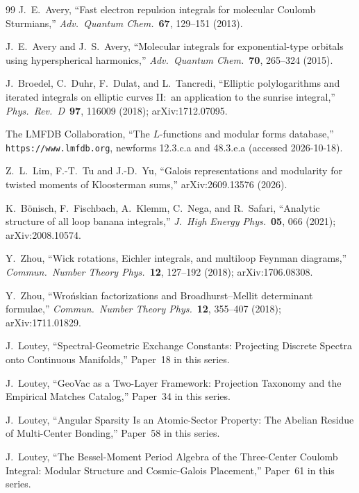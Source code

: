 \documentclass[aps,pra,twocolumn,superscriptaddress,longbibliography]{revtex4-2}
\begin{document}
\begin{thebibliography}{99}
J.~E.~Avery, ``Fast electron repulsion integrals for molecular Coulomb
Sturmians,'' \textit{Adv.\ Quantum Chem.}\ \textbf{67}, 129--151 (2013).

J.~E.~Avery and J.~S.~Avery, ``Molecular integrals for exponential-type orbitals
using hyperspherical harmonics,'' \textit{Adv.\ Quantum Chem.}\ \textbf{70},
265--324 (2015).

J.~Broedel, C.~Duhr, F.~Dulat, and L.~Tancredi, ``Elliptic polylogarithms and
iterated integrals on elliptic curves II:\ an application to the sunrise
integral,'' \textit{Phys.\ Rev.\ D}\ \textbf{97}, 116009 (2018);
arXiv:1712.07095.

The LMFDB Collaboration, ``The $L$-functions and modular forms database,''
\texttt{https://www.lmfdb.org}, newforms 12.3.c.a and 48.3.e.a (accessed 2026-10-18).

Z.~L.~Lim, F.-T.~Tu and J.-D.~Yu, ``Galois representations and modularity
for twisted moments of Kloosterman sums,'' arXiv:2609.13576 (2026).

K.~B\"onisch, F.~Fischbach, A.~Klemm, C.~Nega, and R.~Safari, ``Analytic
structure of all loop banana integrals,'' \textit{J.\ High Energy Phys.}\
\textbf{05}, 066 (2021); arXiv:2008.10574.

Y.~Zhou, ``Wick rotations, Eichler integrals, and multiloop Feynman diagrams,''
\textit{Commun.\ Number Theory Phys.}\ \textbf{12}, 127--192 (2018);
arXiv:1706.08308.

Y.~Zhou, ``Wro\'nskian factorizations and Broadhurst--Mellit determinant
formulae,'' \textit{Commun.\ Number Theory Phys.}\ \textbf{12}, 355--407 (2018);
arXiv:1711.01829.

J.~Loutey, ``Spectral-Geometric Exchange Constants: Projecting Discrete
Spectra onto Continuous Manifolds,'' Paper~18 in this series.

J.~Loutey, ``GeoVac as a Two-Layer Framework: Projection Taxonomy and the
Empirical Matches Catalog,'' Paper~34 in this series.

J.~Loutey, ``Angular Sparsity Is an Atomic-Sector Property: The Abelian
Residue of Multi-Center Bonding,'' Paper~58 in this series.

J.~Loutey, ``The Bessel-Moment Period Algebra of the Three-Center Coulomb
Integral: Modular Structure and Cosmic-Galois Placement,'' Paper~61 in this
series.


\end{thebibliography}
\end{document}
